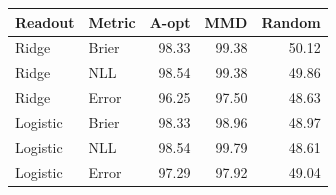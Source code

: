 \begin{tabular}{llrrr}
\toprule
Readout & Metric & A-opt & MMD & Random\\
\midrule
Ridge & Brier & 98.33 & 99.38 & 50.12\\
Ridge & NLL & 98.54 & 99.38 & 49.86\\
Ridge & Error & 96.25 & 97.50 & 48.63\\
Logistic & Brier & 98.33 & 98.96 & 48.97\\
Logistic & NLL & 98.54 & 99.79 & 48.61\\
Logistic & Error & 97.29 & 97.92 & 49.04\\
\bottomrule
\end{tabular}
